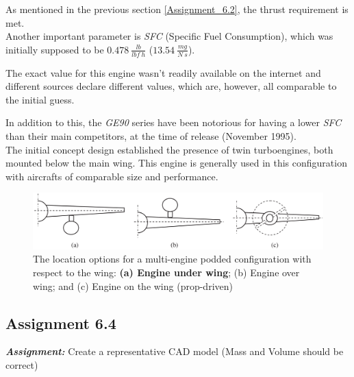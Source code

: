 \documentclass{article}
\begin{document}
As mentioned in the previous section \ref{Assignment_6.2}, the thrust requirement is met.\\

Another important parameter is \textit{SFC} (Specific Fuel Consumption), which was initially supposed to be 
$0.478 \ \frac{lb}{lbf \ h}$  ($13.54 \ \frac{mg}{N \ s}$). 

The exact value for this engine wasn't readily available on the internet and different sources
declare different values, which are, however, all comparable to the initial guess.

In addition to this, the \textit{GE90} series have been notorious for having a lower \textit{SFC} 
than their main competitors, at the time of release (November 1995).\\ 

The initial concept design established the presence of twin turboengines, both mounted below the main wing.
This engine is generally used in this configuration with aircrafts of comparable size and performance. \\ 

\begin{figure}[h!]
    \centering
    \includegraphics[width=\textwidth]{Sources/Plots_and_Pictures/engine_location.png}
    \caption{The location options for a multi-engine podded configuration with respect to the
    wing: \textbf{(a) Engine under wing}; (b) Engine over wing; and (c) Engine on the wing (prop-driven)}
    \label{engine_location}
\end{figure}


\clearpage




\subsection{Assignment 6.4\label{Assignment_6.4}}

\textbf{\textit{Assignment:}} Create a representative CAD model 
(Mass and Volume should be correct) \\ \\ \\ 

\clearpage
\end{document}
